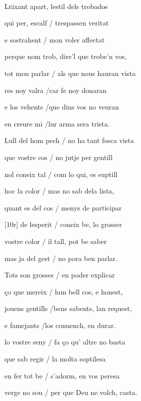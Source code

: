 \documentclass[12pt]{article}
\renewcommand{\espaiAbansEtiquetaPoema}{\vspace{0ex}}
\begin{document}
\begin{estrofa}

\espaiAbansEtiquetaPoema

\\

\end{estrofa}


\begin{estrofa}

 L\textsc{e}ixant apart,   lestil dels trobados

 qui per, escalf / trespassen veritat

 e sostrahent / mon voler affectat

 perque nom trob,   dire'l que trobe'n vos,

 tot mon parlar / als que nous hauran vista

 res noy valra /car fe noy donaran

 e los vehents /que dins vos no veuran

 en creure mi /lur arma sera trista.

\end{estrofa}



\begin{estrofa}

 Lull del hom pech / no ha tant fosca vista

 que vostre cos / no jutje per gentill

 nol coneix tal / com lo qui, es suptill

 hoc la color / mas no sab dela lista,

 quant es del cos / menys de participar

 [10r] de lesperit / coneix be, lo grosser

 vostre color / il tall, pot be saber

 mas ja del gest / no pora ben parlar.

\end{estrofa}



\begin{estrofa}

 Tots son grosses / en poder explicar

 \c{c}o que mereix / hun bell cos, e honest,

 jouens gentills /bens sabents, lan request,

 e famejants /los conuench, en durar.

 lo vostre seny / fa \c{c}o qu' altre no basta

 que sab regir / la molta soptilesa

 en fer tot be / s'adorm, en vos peresa

 verge no sou / per que Deu ne volch, casta.

\end{estrofa}
\end{document}
